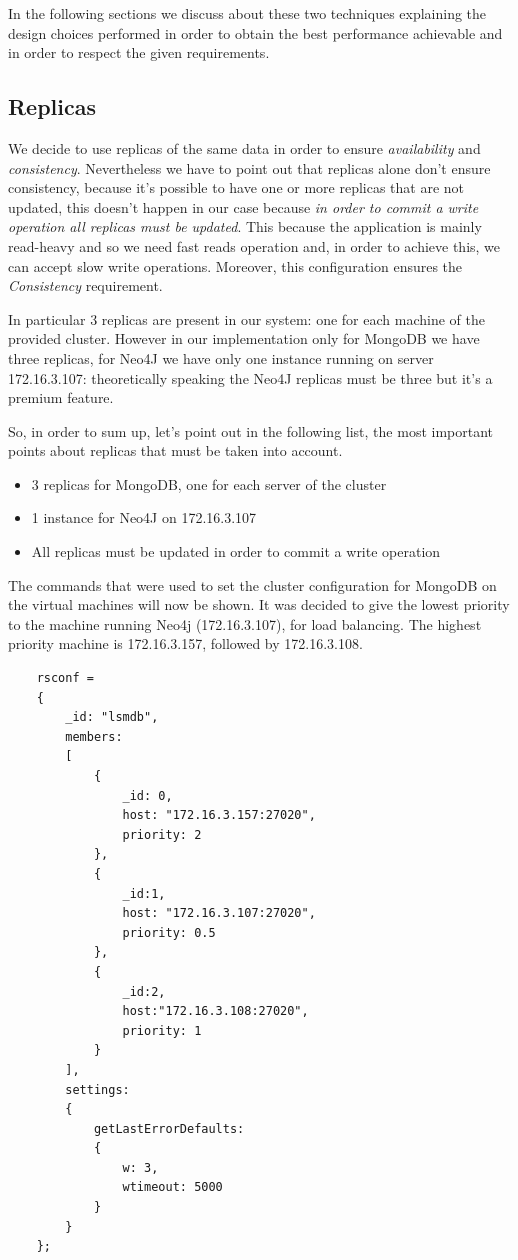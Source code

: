 \documentclass[a4paper]{report}
\begin{document}
\noindent In the following sections we discuss about these two techniques explaining the design choices performed in order to obtain the best performance achievable and in order to respect the given requirements. 

\subsection{Replicas}
We decide to use replicas of the same data in order to ensure \emph{availability} and \emph{consistency}. Nevertheless we have to point out that replicas alone don't ensure consistency, because it's possible to have one or more replicas that are not updated, this doesn't happen in our case because \emph{in order to commit a write operation all replicas must be updated}. This because the application is mainly read-heavy and so we need fast reads operation and, in order to achieve this, we can accept slow write operations. Moreover, this configuration ensures the \emph{Consistency} requirement.

\noindent \noindent In particular 3 replicas are present in our system: one for each machine of the provided cluster. However in our implementation only for MongoDB we have three replicas, for Neo4J we have only one instance running on server 172.16.3.107: theoretically speaking the Neo4J replicas must be three but it's a premium feature.

\noindent So, in order to sum up, let's point out in the following list, the most important points about replicas that must be taken into account.
\begin{itemize}
	\item 3 replicas for MongoDB, one for each server of the cluster
	\item 1 instance for Neo4J on 172.16.3.107
	\item All replicas must be updated in order to commit a write operation
\end{itemize}

\noindent The commands that were used to set the cluster configuration for MongoDB on the virtual machines will now be shown. It was decided to give the lowest priority to the machine running Neo4j (172.16.3.107), for load balancing. The highest priority machine is 172.16.3.157, followed by 172.16.3.108.
\begin{lstlisting}
	rsconf = 
	{
		_id: "lsmdb", 
		members: 
		[
			{
				_id: 0, 
				host: "172.16.3.157:27020", 
				priority: 2
			}, 
			{
				_id:1, 
				host: "172.16.3.107:27020", 
				priority: 0.5
			}, 
			{
				_id:2, 
				host:"172.16.3.108:27020", 
				priority: 1
			}
		], 
		settings: 
		{
			getLastErrorDefaults: 
			{
				w: 3, 
				wtimeout: 5000
			}
		}
	};	
\end{lstlisting} 
\end{document}
